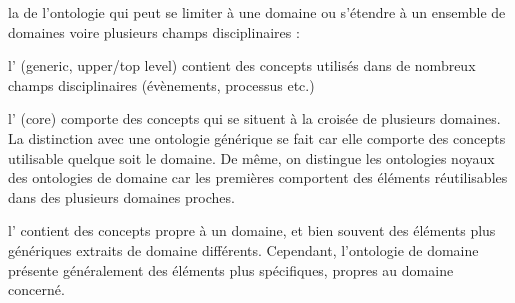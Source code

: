 \begin{liste}
	\item la  de l'ontologie qui peut se limiter à une domaine ou s'étendre à un ensemble de domaines voire plusieurs champs disciplinaires : 
	\begin{liste}
		\item l' (generic, upper/top level) contient des concepts utilisés dans de nombreux champs disciplinaires (évènements, processus etc.)
		\item l' (core) comporte des concepts qui se situent à la croisée de plusieurs domaines. 
		La distinction avec une ontologie générique se fait car elle comporte des concepts utilisable quelque soit le domaine.
		De même, on distingue les ontologies noyaux des ontologies de domaine car les premières comportent des éléments réutilisables dans des plusieurs domaines proches. 
		\item l' contient des concepts propre à un domaine, et bien souvent des éléments plus génériques extraits de domaine différents.
		Cependant, l'ontologie de domaine présente généralement des éléments plus spécifiques, propres au domaine concerné. 
	\end{liste}
\end{liste}